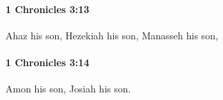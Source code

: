 		\paragraph{1 Chronicles 3:13} %
			\label{1CHRONICLES-3-13}

			Ahaz his son, Hezekiah his son, Manasseh his son,


		\paragraph{1 Chronicles 3:14} %
			\label{1CHRONICLES-3-14}

			Amon his son, Josiah his son.


